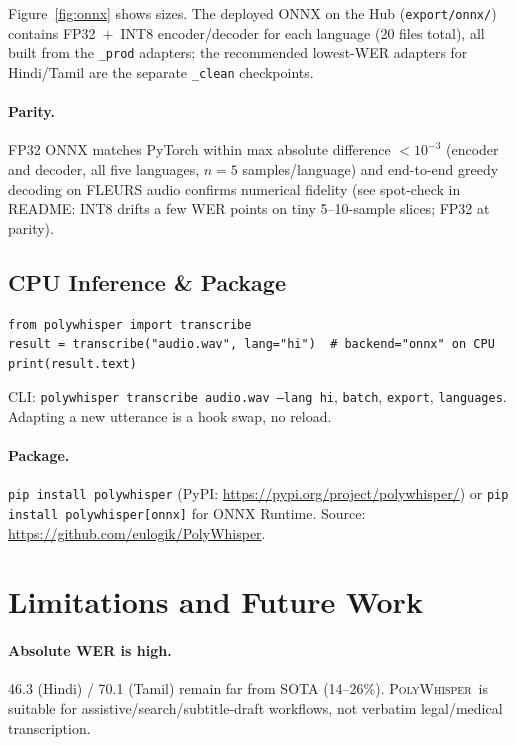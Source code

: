 \documentclass[11pt,a4paper]{article}
\newcommand{\poly}{\textsc{PolyWhisper}}
\begin{document}
Figure~\ref{fig:onnx} shows sizes.
The deployed ONNX on the Hub (\texttt{export/onnx/}) contains FP32~$+$~INT8 encoder/decoder for each language (20 files total), all built from the \texttt{\_prod} adapters; the recommended lowest-WER adapters for Hindi/Tamil are the separate \texttt{\_clean} checkpoints.

\paragraph{Parity.}
FP32 ONNX matches PyTorch within max absolute difference $<10^{-3}$ (encoder and decoder, all five languages, $n=5$ samples/language) and end-to-end greedy decoding on FLEURS audio confirms numerical fidelity (see spot-check in README: INT8 drifts a few WER points on tiny 5--10-sample slices; FP32 at parity).

\subsection{CPU Inference \& Package}

\begin{verbatim}
from polywhisper import transcribe
result = transcribe("audio.wav", lang="hi")  # backend="onnx" on CPU
print(result.text)
\end{verbatim}

CLI: \texttt{polywhisper transcribe audio.wav --lang hi}, \texttt{batch}, \texttt{export}, \texttt{languages}.
Adapting a new utterance is a hook swap, no reload.

\paragraph{Package.}
\texttt{pip install polywhisper} (PyPI: \url{https://pypi.org/project/polywhisper/}) or
\texttt{pip install polywhisper[onnx]} for ONNX Runtime.
Source: \url{https://github.com/eulogik/PolyWhisper}.

\section{Limitations and Future Work}

\paragraph{Absolute WER is high.}
46.3 (Hindi) / 70.1 (Tamil) remain far from SOTA (14--26\%).
\poly\ is suitable for assistive/search/subtitle-draft workflows, not verbatim legal/medical transcription.
\end{document}
